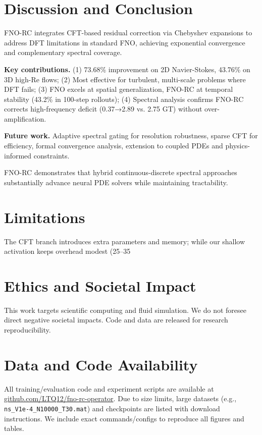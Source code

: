 \documentclass[11pt]{article}
\begin{document}
\section{Discussion and Conclusion}

FNO-RC integrates CFT-based residual correction via Chebyshev expansions to address DFT limitations in standard FNO, achieving exponential convergence and complementary spectral coverage.

\textbf{Key contributions.} (1) 73.68\% improvement on 2D Navier-Stokes, 43.76\% on 3D high-Re flows; (2) Most effective for turbulent, multi-scale problems where DFT fails; (3) FNO excels at spatial generalization, FNO-RC at temporal stability (43.2\% in 100-step rollouts); (4) Spectral analysis confirms FNO-RC corrects high-frequency deficit (0.37→2.89 vs. 2.75 GT) without over-amplification.

\textbf{Future work.} Adaptive spectral gating for resolution robustness, sparse CFT for efficiency, formal convergence analysis, extension to coupled PDEs and physics-informed constraints.

FNO-RC demonstrates that hybrid continuous-discrete spectral approaches substantially advance neural PDE solvers while maintaining tractability.

\section*{Limitations}
The CFT branch introduces extra parameters and memory; while our shallow activation keeps overhead modest (25–35%

\section*{Ethics and Societal Impact}
This work targets scientific computing and fluid simulation. We do not foresee direct negative societal impacts. Code and data are released for research reproducibility.

\section*{Data and Code Availability}
All training/evaluation code and experiment scripts are available at \href{https://github.com/LTQ12/fno-rc-operator}{github.com/LTQ12/fno-rc-operator}. Due to size limits, large datasets (e.g., \texttt{ns\_V1e-4\_N10000\_T30.mat}) and checkpoints are listed with download instructions. We include exact commands/configs to reproduce all figures and tables.
\end{document}
